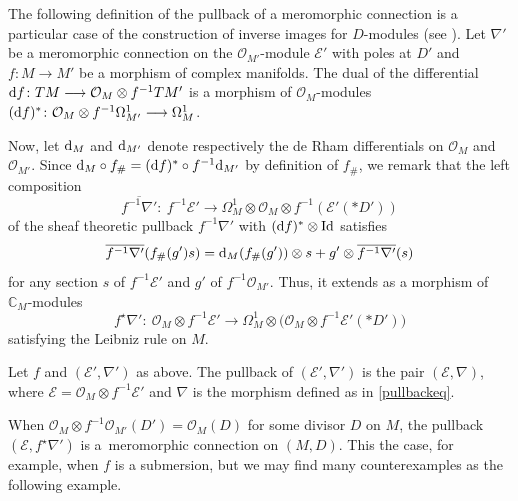 \documentclass[pdftex]{sigma}
\numberwithin{equation}{section}
\begin{document}
The following definition of the pullback of a meromorphic connection is a particular case of the construction of inverse images for $D$-modules (see \cite[p.~21]{Hotta}). Let $\nabla'$ be a meromorphic connection on the $\mathcal{O}_{M'}$-module $\mathcal{E}'$ with poles at $D'$ and $f\colon M\longrightarrow M'$ be a morphism of complex manifolds. The dual of the differential ${\rm d}f\colon TM \longrightarrow \mathcal{O}_M \otimes f^{-1}TM'$ is a morphism of $\mathcal{O}_M$-modules $({\rm d}f)^* \colon \mathcal{O}_M \otimes f^{-1} \Omega^1_{M'} \longrightarrow \Omega^1_M$.


Now, let ${\rm d}_M$ and ${\rm d}_{M'}$ denote respectively the de Rham differentials on $\mathcal{O}_M$ and $\mathcal{O}_{M'}$. Since ${\rm d}_M \circ f_\# = ({\rm d}f)^* \circ f^{-1} {\rm d}_{M'}$ by definition of $f_\#$, we remark that the left composition
\[\overline{f^{-1}\nabla'}\colon\ f^{-1}\mathcal{E}' \longrightarrow \Omega^1_M \otimes \mathcal{O}_M \otimes f^{-1}(\mathcal{E}'(* D'))\]
 of the sheaf theoretic pullback $f^{-1}\nabla'$ with $({\rm d}f)^*\otimes {\rm Id}$ satisfies
 \begin{equation}\label{nablabar} \overline{f^{-1}\nabla'}(f_\#(g')s) = {\rm d}_M(f_\#(g')) \otimes s + g' \otimes \overline{f^{-1}\nabla'}(s) \end{equation}
 for any section $s$ of $f^{-1}\mathcal{E}'$ and $g'$ of $f^{-1}\mathcal{O}_{M'}$. Thus, it extends as a morphism of $\mathbb{C}_{M}$-modules
 \begin{equation}\label{pullbackeq} f^\star \nabla' \colon \ \mathcal{O}_M\otimes f^{-1}\mathcal{E}' \longrightarrow \Omega^1_M \otimes \big(\mathcal{O}_M\otimes f^{-1}\mathcal{E}'(* D')\big) \end{equation}
 satisfying the Leibniz rule on $M$.

\begin{Definition}\label{pullback}Let $f$ and $(\mathcal{E}',\nabla')$ as above. The pullback of $(\mathcal{E}',\nabla')$ is the pair $(\mathcal{E},\nabla)$, where $\mathcal{E}=\mathcal{O}_M \otimes f^{-1}\mathcal{E}'$ and $\nabla$ is the morphism defined as in \eqref{pullbackeq}. \end{Definition}

When $\mathcal{O}_M\otimes f^{-1}\mathcal{O}_{M'}(D') = \mathcal{O}_M(D)$ for some divisor $D$ on $M$, the pullback $(\mathcal{E},f^\star \nabla')$ is a~meromorphic connection on $(M,D)$. This the case, for example, when $f$ is a submersion, but we may find many counterexamples as the following example.
\end{document}
